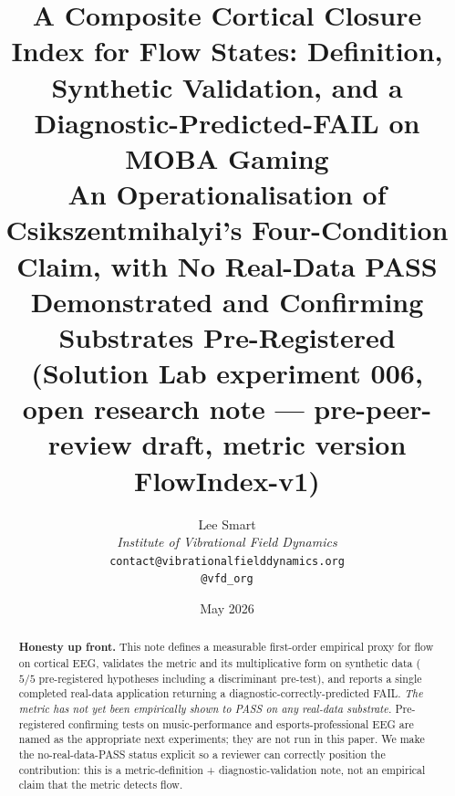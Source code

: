 \documentclass[11pt,a4paper]{article}
\title{\textbf{A Composite Cortical Closure Index for Flow States: Definition, Synthetic Validation, and a Diagnostic-Predicted-FAIL on MOBA Gaming}\\[2pt]
\large An Operationalisation of Csikszentmihalyi's Four-Condition Claim, with No Real-Data PASS Demonstrated and Confirming Substrates Pre-Registered\\[1pt]
\small (Solution Lab experiment 006, open research note --- pre-peer-review draft, metric version FlowIndex-v1)}
\author{%
  Lee Smart\\[4pt]
  \textit{Institute of Vibrational Field Dynamics}\\[2pt]
  \texttt{contact@vibrationalfielddynamics.org}\\[2pt]
  \texttt{@vfd\_org}%
}
\date{May 2026}
\begin{document}
\maketitle
\thispagestyle{empty}

\begin{abstract}
\noindent
\textbf{Honesty up front.} This note defines a measurable first-order empirical proxy for flow on cortical EEG, validates the metric and its multiplicative form on synthetic data ($5/5$ pre-registered hypotheses including a discriminant pre-test), and reports a single completed real-data application returning a diagnostic-correctly-predicted FAIL. \emph{The metric has not yet been empirically shown to PASS on any real-data substrate.} Pre-registered confirming tests on music-performance and esports-professional EEG are named as the appropriate next experiments; they are not run in this paper. We make the no-real-data-PASS status explicit so a reviewer can correctly position the contribution: this is a metric-definition + diagnostic-validation note, not an empirical claim that the metric detects flow.


\end{abstract}
\end{document}
